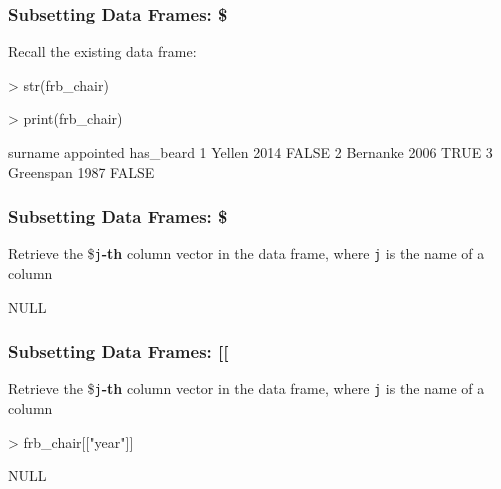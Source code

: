 \documentclass{beamer}
\newcommand{\R}[1]{\texttt{#1}}
\begin{document}
\begin{frame}[fragile]
\frametitle{Subsetting Data Frames: \$}

Recall the existing data frame:
\begin{Schunk}
\begin{Sinput}
> str(frb_chair)
\end{Sinput}
\begin{Sinput}
> print(frb_chair)
\end{Sinput}
\begin{Soutput}
    surname appointed has_beard
1    Yellen      2014     FALSE
2  Bernanke      2006      TRUE
3 Greenspan      1987     FALSE
\end{Soutput}
\end{Schunk}

\end{frame}



\begin{frame}[fragile]
\frametitle{Subsetting Data Frames: \$}

Retrieve the \$\R{j}\textbf{-th} column vector in the data frame, where \R{j} is the name of a column
\begin{Schunk}
\end{Schunk}
\pause
\begin{Schunk}
\begin{Soutput}
NULL
\end{Soutput}
\end{Schunk}
\end{frame}



\begin{frame}[fragile]
\frametitle{Subsetting Data Frames: [[}

Retrieve the \$\R{j}\textbf{-th} column vector in the data frame, where \R{j} is the name  of a column
\begin{Schunk}
\begin{Sinput}
> frb_chair[["year"]]
\end{Sinput}
\end{Schunk}
\pause
\begin{Schunk}
\begin{Soutput}
NULL
\end{Soutput}
\end{Schunk}
\end{frame}
\end{document}
